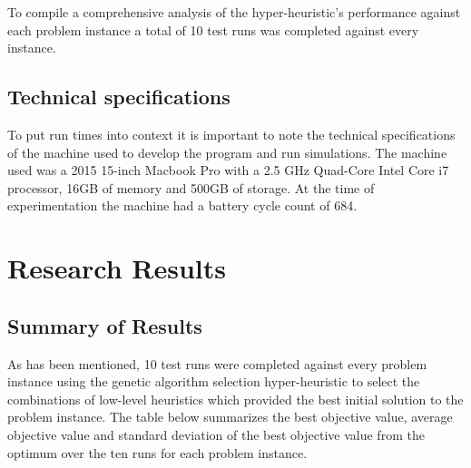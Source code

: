 \documentclass[conference]{IEEEtran}
\begin{document}
To compile a comprehensive analysis of the hyper-heuristic's performance against each problem instance a total of 10 test runs was completed against every instance.

\subsection{Technical specifications}

To put run times into context it is important to note the technical specifications of the machine used to develop the program and run simulations. The machine used was a 2015 15-inch Macbook Pro with a 2.5 GHz Quad-Core Intel Core i7 processor, 16GB of memory and 500GB of storage. At the time of experimentation the machine had a battery cycle count of 684.

\section{Research Results}

\subsection{Summary of Results}

As has been mentioned, 10 test runs were completed against every problem  instance using the genetic algorithm selection hyper-heuristic to select the combinations of low-level heuristics which provided the best initial solution to the problem instance. The table below summarizes the best objective value, average objective value and standard deviation of the best objective value from the optimum over the ten runs for each problem instance.
\end{document}
